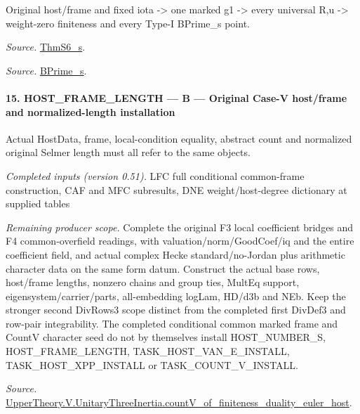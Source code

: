 Original host/frame and fixed iota -> one marked g1 -> every universal R,u -> weight-zero finiteness and every Type-I BPrime\_\allowbreak s point.

\emph{Source.} \href{https://github.com/CocoSgt/riemann-hypothesis-lean/blob/7cbf7a0c32fca1badf05931879a37c3f8a2b03b4/src/Development/AutomorphicArithmetic/AutomorphicVarieties/ModularityArgument/ThresholdArguments/DenseThresholdCases/ThmS6CoreS.lean#L17-L26}{ThmS6\_\allowbreak s}.

\emph{Source.} \href{https://github.com/CocoSgt/riemann-hypothesis-lean/blob/7cbf7a0c32fca1badf05931879a37c3f8a2b03b4/src/Development/AutomorphicArithmetic/AutomorphicVarieties/ModularityArgument/ThresholdArguments/DenseThresholdCases/ThmS6CoreS.lean#L12-L16}{BPrime\_\allowbreak s}.



\paragraph{15. HOST\_\allowbreak FRAME\_\allowbreak LENGTH — B — Original Case-V host/frame and normalized-length installation}

Actual HostData, frame, local-condition equality, abstract count and normalized original Selmer length must all refer to the same objects.

\emph{Completed inputs (version 0.51).} LFC full conditional common-frame construction, CAF and MFC subresults, DNE weight/host-degree dictionary at supplied tables

\emph{Remaining producer scope.} Complete the original F3 local coefficient bridges and F4 common-overfield readings, with valuation/norm/GoodCoef/iq and the entire coefficient field, and actual complex Hecke standard/no-Jordan plus arithmetic character data on the same form datum. Construct the actual base rows, host/frame lengths, nonzero chains and group ties, MultEq support, eigensystem/carrier/parts, all-embedding logLam, HD/d3b and NEb. Keep the stronger second DivRows3 scope distinct from the completed first DivDef3 and row-pair integrability. The completed conditional common marked frame and CountV character seed do not by themselves install HOST\_\allowbreak NUMBER\_\allowbreak S, HOST\_\allowbreak FRAME\_\allowbreak LENGTH, TASK\_\allowbreak HOST\_\allowbreak VAN\_\allowbreak E\_\allowbreak INSTALL, TASK\_\allowbreak HOST\_\allowbreak XPP\_\allowbreak INSTALL or TASK\_\allowbreak COUNT\_\allowbreak V\_\allowbreak INSTALL.

\emph{Source.} \href{https://github.com/CocoSgt/riemann-hypothesis-lean/blob/7cbf7a0c32fca1badf05931879a37c3f8a2b03b4/src/Development/AutomorphicArithmetic/AutomorphicVarieties/ModularityArgument/ThresholdArguments/DenseThresholdCases/CountVOf.lean#L33-L60}{UpperTheory.V.UnitaryThreeInertia.countV\_\allowbreak of\_\allowbreak finiteness\_\allowbreak duality\_\allowbreak euler\_\allowbreak host}.



